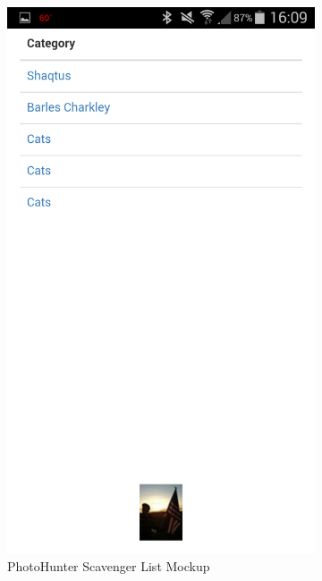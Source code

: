 \documentclass{article}
\begin{document}
\begin{figure}
  \centering
  \begin{subfigure}[b]{0.49\textwidth}
    \includegraphics[width=\textwidth]{photohunter/list}
    \caption{PhotoHunter Scavenger List Mockup}
  \end{subfigure}
  \begin{subfigure}[b]{0.49\textwidth}

\end{subfigure}
\end{figure}
\end{document}
